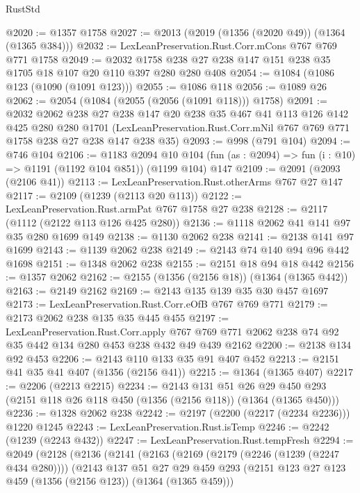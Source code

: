 \begin{lexlean}{RustStd}
\begin{coremodule}
{\begin{coremodule}
{{{{{{{@2020 := @1357 @1758
@2027 := @2013 (@2019 (@1356 (@2020 @49)) (@1364 (@1365 @384)))
@2032 := LexLeanPreservation.Rust.Corr.mCons @767 @769 @771 @1758
@2049 := @2032 @1758 @238 @27 @238 @147 @151 @238 @35 @1705 @18 @107 @20 @110 @397 @280 @280 @408
@2054 := @1084 (@1086 @123 (@1090 (@1091 @123)))
@2055 := @1086 @118
@2056 := @1089 @26
@2062 := @2054 (@1084 (@2055 (@2056 (@1091 @118))) @1758)
@2091 := @2032
    @2062
    @238
    @27
    @238
    @147
    @20
    @238
    @35
    @467
    @41
    @113
    @126
    @142
    @425
    @280
    @280
    @1701
    (LexLeanPreservation.Rust.Corr.mNil @767 @769 @771 @1758 @238 @27 @238 @147 @238 @35)
@2093 := @998 (@791 @104)
@2094 := @746 @104
@2106 := @1183
    @2094
    @10
    @104
    (fun (as : @2094) => fun (i : @10) => @1191 (@1192 @104 @851))
    (@1199 @104)
    @147
@2109 := @2091 (@2093 (@2106 @41))
@2113 := LexLeanPreservation.Rust.otherArms @767 @27 @147
@2117 := @2109 (@1239 (@2113 @20 @113))
@2122 := LexLeanPreservation.Rust.armPat @767 @1758 @27 @238
@2128 := @2117 (@1112 (@2122 @113 @126 @425 @280))
@2136 := @1118 @2062 @41 @141 @97 @35 @280 @1699 @149
@2138 := @1130 @2062 @238
@2141 := @2138 @141 @97 @1699
@2143 := @1139 @2062 @238
@2149 := @2143 @74 @140 @94 @96 @442 @1698
@2151 := @1348 @2062 @238
@2155 := @2151 @18 @94 @18 @442
@2156 := @1357 @2062
@2162 := @2155 (@1356 (@2156 @18)) (@1364 (@1365 @442))
@2163 := @2149 @2162
@2169 := @2143 @135 @139 @35 @30 @457 @1697
@2173 := LexLeanPreservation.Rust.Corr.eOfB @767 @769 @771
@2179 := @2173 @2062 @238 @135 @35 @445 @455
@2197 := LexLeanPreservation.Rust.Corr.apply
    @767
    @769
    @771
    @2062
    @238
    @74
    @92
    @35
    @442
    @134
    @280
    @453
    @238
    @432
    @49
    @439
    @2162
@2200 := @2138 @134 @92 @453
@2206 := @2143 @110 @133 @35 @91 @407 @452
@2213 := @2151 @41 @35 @41 @407 (@1356 (@2156 @41))
@2215 := @1364 (@1365 @407)
@2217 := @2206 (@2213 @2215)
@2234 := @2143
    @131
    @51
    @26
    @29
    @450
    @293
    (@2151 @118 @26 @118 @450 (@1356 (@2156 @118)) (@1364 (@1365 @450)))
@2236 := @1328 @2062 @238
@2242 := @2197 (@2200 (@2217 (@2234 @2236))) @1220 @1245
@2243 := LexLeanPreservation.Rust.isTemp
@2246 := @2242 (@1239 (@2243 @432))
@2247 := LexLeanPreservation.Rust.tempFresh
@2294 := @2049
    (@2128
      (@2136
        (@2141
          (@2163
            (@2169
              (@2179 (@2246 (@1239 (@2247 @434 @280))))
              (@2143
                @137
                @51
                @27
                @29
                @459
                @293
                (@2151 @123 @27 @123 @459 (@1356 (@2156 @123)) (@1364 (@1365 @459)))
}}}}}}}
\end{coremodule}}
\end{coremodule}
\end{lexlean}
